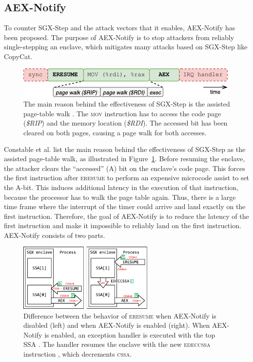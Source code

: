 \documentclass{llncs}
\begin{document}
\subsection{AEX-Notify}
\label{sec:aex-notify}

To counter SGX-Step and the attack vectors that it enables, AEX-Notify has been
proposed.
The purpose of AEX-Notify is to stop attackers from reliably single-stepping an
enclave, which mitigates many attacks based on SGX-Step like CopyCat.

\begin{figure}[t]
  \centering
  \includegraphics{images/sgx-step-without-prefetch.pdf}
  \caption{
    The main reason behind the effectiveness of SGX-Step is the assisted
    page-table walk \cite{ConstableBCXXAK23}.
    The \textsc{mov} instruction has to access the code page
    (\textsf{\itshape\$RIP}) and the memory location (\textsf{\itshape\$RDI}).
    The accessed bit has been cleared on both pages, causing a page walk for
    both accesses.}
  \label{fig:pte-walk}
\end{figure}

Constable et al. \cite{ConstableBCXXAK23} list the main reason behind the
effectiveness of SGX-Step as the assisted page-table walk, as illustrated in
Figure~\ref{fig:pte-walk}.
Before resuming the enclave, the attacker clears the ``accessed'' (A) bit on
the enclave's code page.
This forces the first instruction after \textsc{eresume}
to perform an expensive microcode assist to set the A-bit.
This induces additional latency in the execution of that instruction, because
the processor has to walk the page table again.
Thus, there is a large time frame where the interrupt of the timer could arrive
and land exactly on the first instruction.
Therefore, the goal of AEX-Notify is to reduce the latency of the first instruction and
make it impossible to reliably land on the first instruction.
AEX-Notify consists of two parts.

\begin{figure}[t]
  \centering
  \includegraphics[width=0.6\textwidth]{images/sgx-ssa-edeccssa.pdf}
  \caption{
    Difference between the behavior of \textsc{eresume} when AEX-Notify is
    disabled (left) and when AEX-Notify is enabled (right).
    When AEX-Notify is enabled, an exception handler is executed with the top
    SSA \protect{}.
    The handler resumes the enclave with the new \textsc{edeccssa} instruction
    \protect{}, which decrements \textsc{cssa}.}
  \label{fig:aex-notify-edeccssa}
\end{figure}
\end{document}
